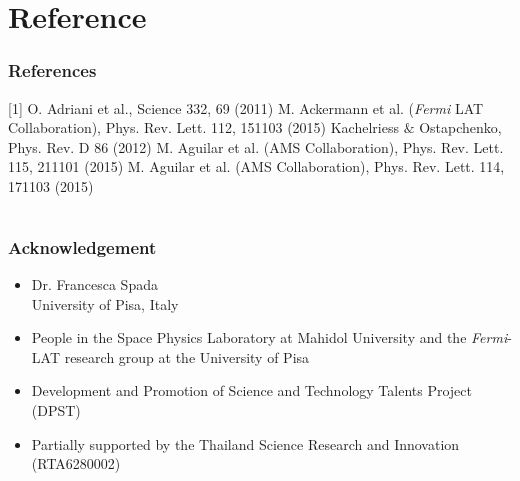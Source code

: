 \documentclass{beamer}
\begin{document}


\section{} %

\section{Reference}
\begin{frame}
\frametitle{References}
[1] O. Adriani et al., Science 332, 69 (2011) \newline
[2] M. Ackermann et al. (\textit{Fermi} LAT Collaboration), Phys. Rev. Lett. 112, 151103 (2015) \newline
[3] Kachelriess $\&$ Ostapchenko, Phys. Rev. D 86 (2012) \newline
[4] M. Aguilar et al. (AMS Collaboration), Phys. Rev. Lett. 115, 211101 (2015) \newline
[5] M. Aguilar et al. (AMS Collaboration), Phys. Rev. Lett. 114, 171103 (2015) \newline
\end{frame}
\section{}
\begin{frame}\frametitle{Acknowledgement}
  \begin{itemize}
    \item Dr. Francesca Spada \\ University of Pisa, Italy
    \item People in the Space Physics Laboratory at Mahidol University and the \textit{Fermi}-LAT research group at the University of Pisa
    \item Development and Promotion of Science and Technology Talents Project (DPST)
    \item Partially supported by the Thailand Science Research and Innovation (RTA6280002)
  \end{itemize}
\end{frame}
\end{document}
